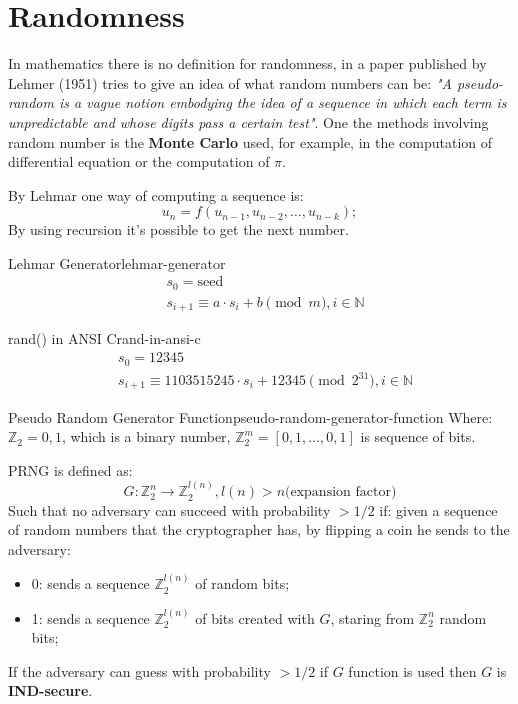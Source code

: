 \documentclass[12pt]{article}
\begin{document}
\section{Randomness}
In mathematics there is no definition for randomness, in a paper published by Lehmer (1951) tries to give an idea of what random numbers can be: \emph{"A pseudo-random is a vague notion embodying the idea of a sequence in which each term is unpredictable and whose digits pass a certain test"}. One the methods involving random number is the \textbf{Monte Carlo} used, for example, in the computation of differential equation or the computation of $\pi$.

By Lehmar one way of computing a sequence is:
\[ u_n = f(u_{n-1}, u_{n-2}, \dots, u_{n-k}); \]
By using recursion it's possible to get the next number.
\begin{definition}{Lehmar Generator}{lehmar-generator}
  \begin{align*}
    & s_0 = \text{seed} \\
    & s_{i+1} \equiv a \cdot s_i + b \pmod{m}, i \in \mathbb{N}
  \end{align*}
\end{definition}
\hfill
\begin{example}{rand() in ANSI C}{rand-in-ansi-c}
  \begin{align*}
    & s_0 = 12345 \\
    & s_{i+1} \equiv 1103515245 \cdot s_i + 12345 \pmod{2^{31}}, i \in \mathbb{N}
  \end{align*}
\end{example}
\hfill
\begin{definition}{Pseudo Random Generator Function}{pseudo-random-generator-function}
  Where: $\mathbb{Z}_2 = {0, 1}$, which is a binary number, $\mathbb{Z}_2^{m} = [{0,1},\dots,{0,1}]$ is sequence of bits.

  PRNG is defined as:
  \[ G: \mathbb{Z}_2^{n} \rightarrow  \mathbb{Z}_2^{l(n)}, l(n) > n \text{(expansion factor)} \]
  Such that no adversary can succeed with probability $> 1/2$ if: given a sequence of random numbers that the cryptographer has, by flipping a coin he sends to the adversary:
  \begin{itemize}
    \item 0: sends a sequence $\mathbb{Z}_2^{l(n)}$ of random bits;
    \item 1: sends a sequence $\mathbb{Z}_2^{l(n)}$ of bits created with $G$, staring from $\mathbb{Z}_2^{n}$ random bits;
  \end{itemize}
  If the adversary can guess with probability $> 1/2$ if $G$ function is used then $G$ is \textbf{IND-secure}.
\end{definition}
\end{document}
